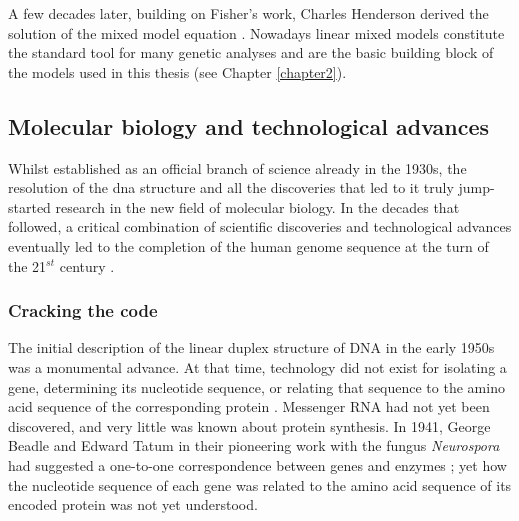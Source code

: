 A few decades later, building on Fisher’s work, Charles Henderson derived the solution of the mixed model equation \cite{henderson1950estimation}. 
Nowadays linear mixed models constitute the standard tool for many genetic analyses and are the basic building block of the models used in this thesis (see Chapter \ref{chapter2}).

\newpage

\subsection{Molecular biology and technological advances}
\label{sec:genetic_timeline}

Whilst established as an official branch of science already in the 1930s, the resolution of the \gls{dna} structure and all the discoveries that led to it truly jump-started research in the new field of molecular biology.
In the decades that followed, a critical combination of scientific discoveries and technological advances eventually led to the completion of the human genome sequence at the turn of the 21$^{st}$ century \cite{nhgri2003genetic}.

\subsubsection{Cracking the code}

The initial description of the linear duplex structure of DNA in the early 1950s was a monumental advance. 
At that time, technology did not exist for isolating a gene, determining its nucleotide sequence, or relating that sequence to the amino acid sequence of the corresponding protein \cite{yanofsky2007establishing}. 
Messenger RNA had not yet been discovered, and very little was known about protein synthesis. 
In 1941, George Beadle and Edward Tatum in their pioneering work with the fungus \textit{Neurospora} had suggested a one-to-one correspondence between genes and enzymes \cite{beadle1941genetic}; 
yet how the nucleotide sequence of each gene was related to the amino acid sequence of its encoded protein was not yet understood.\\

